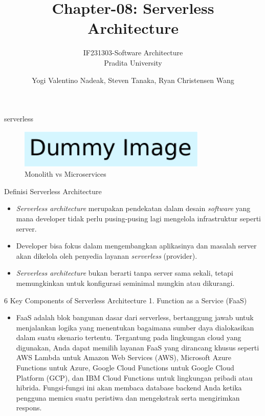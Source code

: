 \documentclass{beamer}
\title{Chapter-08: Serverless Architecture}
\subtitle{IF231303-Software Architecture\\Pradita University}
\author{Yogi Valentino Nadeak, Steven Tanaka, Ryan Christensen Wang}
\begin{document}
	\begin{frame}{serverless}
		\begin{figure}[h]
			\centering
			\includegraphics[width=0.8\textwidth]{dummy}
			\caption{Monolith vs Microservices}
			\label{fig:serverless}
		\end{figure}
	\end{frame}

    \begin{frame}[plain]
		\maketitle
	\end{frame}
	

    \begin{frame}{Definisi Serverless Architecture}
        \begin{itemize}
            \item \emph{Serverless architecture} merupakan pendekatan dalam desain \emph{software} yang mana developer tidak perlu pusing-pusing lagi mengelola infrastruktur seperti server.
            \item Developer bisa fokus dalam mengembangkan aplikasinya dan masalah server akan dikelola oleh penyedia layanan \emph{serverless} (provider).
            \item \emph{Serverless architecture} bukan berarti tanpa server sama sekali, tetapi memungkinkan untuk konfigurasi seminimal mungkin atau dikurangi.
        \end{itemize}
    \end{frame}

    \begin{frame}{6 Key Components of Serverless Architecture}
    	1. Function as a Service (FaaS)
        \begin{itemize}
            \item 
            FaaS adalah blok bangunan dasar dari serverless, bertanggung jawab untuk menjalankan logika yang menentukan bagaimana sumber daya dialokasikan dalam suatu skenario tertentu. 
            Tergantung pada lingkungan cloud yang digunakan, Anda dapat memilih layanan FaaS yang dirancang khusus seperti AWS Lambda untuk Amazon Web Services (AWS), Microsoft Azure Functions untuk Azure, Google Cloud Functions untuk Google Cloud Platform (GCP), dan IBM Cloud Functions untuk lingkungan pribadi atau hibrida. 
            Fungsi-fungsi ini akan membaca database backend Anda ketika pengguna memicu suatu peristiwa dan mengekstrak serta mengirimkan respons.
        \end{itemize}
    \end{frame}
\end{document}
